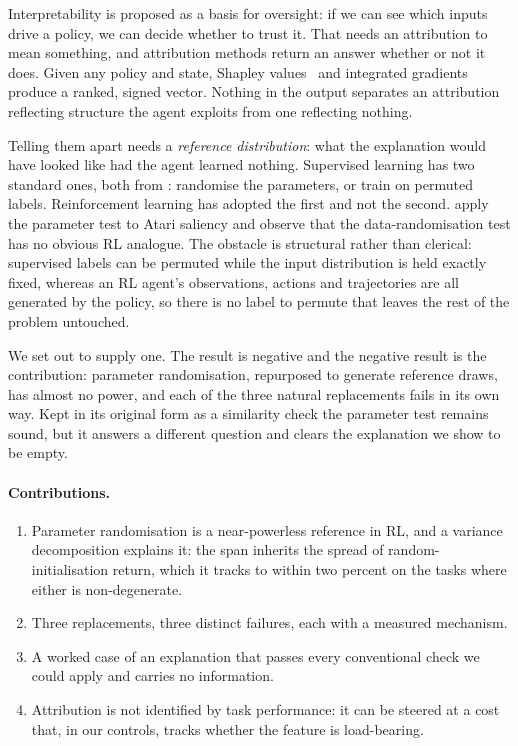 \documentclass[10pt,twocolumn]{article}
\begin{document}
Interpretability is proposed as a basis for oversight: if we can see which
inputs drive a policy, we can decide whether to trust it. That needs an
attribution to mean something, and attribution methods return an answer whether
or not it does. Given any policy and state, Shapley
values~\citep{shapley1953value,lundberg2017unified} and integrated
gradients~\citep{sundararajan2017axiomatic} produce a ranked, signed vector.
Nothing in the output separates an attribution reflecting structure the agent
exploits from one reflecting nothing.

Telling them apart needs a \emph{reference distribution}: what the explanation
would have looked like had the agent learned nothing. Supervised learning has
two standard ones, both from \citet{adebayo2018sanity}: randomise the
parameters, or train on permuted labels. Reinforcement learning has adopted the
first and not the second. \citet{huber2022benchmarking} apply the parameter test
to Atari saliency and observe that the data-randomisation test has no obvious RL
analogue. The obstacle is structural rather than clerical: supervised labels can
be permuted while the input distribution is held exactly fixed, whereas an RL
agent's observations, actions and trajectories are all generated by the policy,
so there is no label to permute that leaves the rest of the problem untouched.

We set out to supply one. The result is negative and the negative result is the
contribution: parameter randomisation, repurposed to generate reference draws,
has almost no power, and each of the three natural replacements fails in its own
way. Kept in its original form as a similarity check the parameter test remains
sound, but it answers a different question and clears the explanation we show to
be empty.

\paragraph{Contributions.}
\begin{enumerate}[leftmargin=1.2em,itemsep=1pt,topsep=2pt]
\item Parameter randomisation is a near-powerless reference in RL, and a variance
decomposition explains it: the span inherits the spread of random-initialisation
return, which it tracks to within two percent on the tasks where either is
non-degenerate.
\item Three replacements, three distinct failures, each with a measured
mechanism.
\item A worked case of an explanation that passes every conventional check we
could apply and carries no information.
\item Attribution is not identified by task performance: it can be steered at a
cost that, in our controls, tracks whether the feature is load-bearing.
\end{enumerate}
\end{document}
